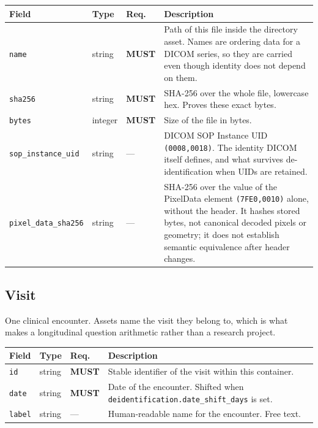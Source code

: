 \documentclass[11pt,a4paper]{article}
\newcommand{\MUST}{\textcolor{uosred}{\textbf{MUST}}}
\newcommand{\code}[1]{\texttt{\small #1}}
\begin{document}
\begin{longtable}{L{3.5cm} L{3.0cm} C{1.4cm} L{6.4cm}}
\toprule
\textbf{Field} & \textbf{Type} & \textbf{Req.} & \textbf{Description}\\
\midrule
\endhead
\code{name} & string & \MUST{} & Path of this file inside the directory asset. Names are ordering data for a DICOM series, so they are carried even though identity does not depend on them.\\
\code{sha256} & string & \MUST{} & SHA-256 over the whole file, lowercase hex. Proves these exact bytes.\\
\code{bytes} & integer & \MUST{} & Size of the file in bytes.\\
\code{sop\_instance\_uid} & string & --- & DICOM SOP Instance UID \code{(0008,0018)}. The identity DICOM itself defines, and what survives de-identification when UIDs are retained.\\
\code{pixel\_data\_sha256} & string & --- & SHA-256 over the value of the PixelData element \code{(7FE0,0010)} alone, without the header. It hashes stored bytes, not canonical decoded pixels or geometry; it does not establish semantic equivalence after header changes.\\
\bottomrule
\end{longtable}

\subsection{Visit}

One clinical encounter. Assets name the visit they belong to, which is what makes a longitudinal question arithmetic rather than a research project.

\begin{longtable}{L{3.5cm} L{3.0cm} C{1.4cm} L{6.4cm}}
\toprule
\textbf{Field} & \textbf{Type} & \textbf{Req.} & \textbf{Description}\\
\midrule
\endhead
\code{id} & string & \MUST{} & Stable identifier of the visit within this container.\\
\code{date} & string & \MUST{} & Date of the encounter. Shifted when \code{deidentification.date\_shift\_days} is set.\\
\code{label} & string & --- & Human-readable name for the encounter. Free text.\\
\bottomrule
\end{longtable}
\end{document}
